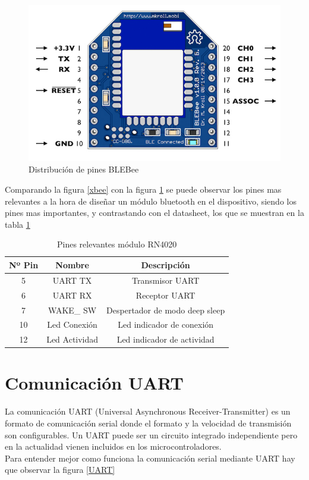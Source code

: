 \begin{figure}[H]
\centering
\includegraphics[scale=0.5]{figuras/bluetooth/blebee.png}
\caption{Distribución de pines BLEBee}
\label{blebee}
\end{figure}

Comparando la figura \ref{xbee} con la figura \ref{blebee} se puede observar los pines mas relevantes a la hora de diseñar un módulo bluetooth en el dispositivo, siendo los pines mas importantes, y contrastando con el datasheet, los que se muestran en la tabla \ref{pines}

\begin{table}[H]
\centering
\begin{tabular}{| c | c | c |}
\hline
\multicolumn{1}{|c|}{\textbf{Nº Pin}}&
\multicolumn{1}{c|}{\textbf{Nombre}}&
\multicolumn{1}{|c|}{\textbf{Descripción}}\\ \hline
5  & UART TX & Transmisor UART\\ \hline
6  & UART RX & Receptor UART\\ \hline
7  & WAKE\_ SW & Despertador de modo deep sleep\\ \hline
10 & Led Conexión  & Led indicador de conexión\\ \hline
12 & Led Actividad & Led indicador de actividad\\ \hline
\end{tabular}
\caption{Pines relevantes módulo RN4020}
\label{pines}
\end{table}

\newpage
\section{Comunicación UART}

La comunicación UART (Universal Asynchronous Receiver-Transmitter) es un formato de comunicación serial donde el formato y la velocidad de transmisión son configurables. Un UART puede ser un circuito integrado independiente pero en la actualidad vienen incluidos en los microcontroladores.\\
Para entender mejor como funciona la comunicación serial mediante UART hay que observar la figura \ref{UART}

